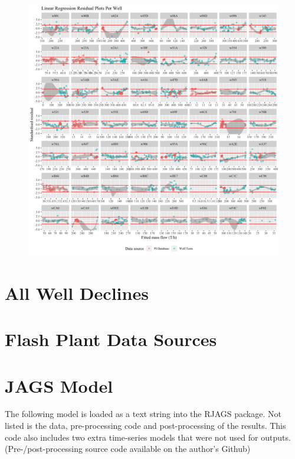 \documentclass[a4paper, 12pt]{article}
\begin{document}
\begin{appendices}
\begin{figure}[H]
  \centering
  \includegraphics[width=\linewidth]{media/stdres}
  \label{fig:stdres}
\end{figure}

\newpage
\section{All Well Declines}


\newpage
\section{Flash Plant Data Sources} \label{sec:fpdata}




\newpage
\section{JAGS Model} \label{sec:jagscode}
The following model is loaded as a text string into the RJAGS package. Not listed is the data, pre-processing code and post-processing of the results. This code also includes two extra time-series models that were not used for outputs. (Pre-/post-processing source code available on the author's Github)



\end{appendices}
\end{document}
